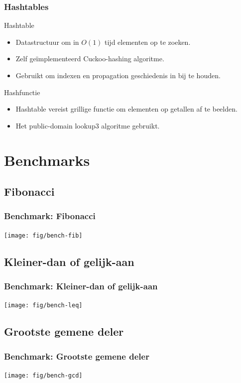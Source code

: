 \documentclass{beamer}
\begin{document}
\begin{frame}
  \frametitle{Hashtables}
  \begin{block}{Hashtable}
    \begin{itemize}
      \item Datastructuur om in $O(1)$ tijd elementen op te zoeken.
      \item Zelf ge\"implementeerd Cuckoo-hashing algoritme.
      \item Gebruikt om indexen en propagation geschiedenis in bij te houden.
    \end{itemize}
  \end{block}
  \begin{block}{Hashfunctie}
    \begin{itemize}
      \item Hashtable vereist grillige functie om elementen op getallen af te beelden.
      \item Het public-domain lookup3 algoritme gebruikt.
    \end{itemize}
  \end{block}
\end{frame}

\section{Benchmarks}

\subsection{Fibonacci}

\begin{frame}
  \frametitle{Benchmark: Fibonacci}
  \texttt{[image: fig/bench-fib]}
\end{frame}

\subsection{Kleiner-dan of gelijk-aan}

\begin{frame}
  \frametitle{Benchmark: Kleiner-dan of gelijk-aan}
  \texttt{[image: fig/bench-leq]}
\end{frame}

\subsection{Grootste gemene deler}

\begin{frame}
  \frametitle{Benchmark: Grootste gemene deler}
  \texttt{[image: fig/bench-gcd]}
\end{frame}
\end{document}
